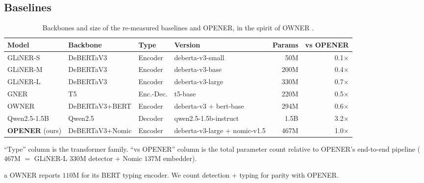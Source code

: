 \documentclass[pdflatex,sn-basic,Numbered]{sn-jnl}
\begin{document}
\subsection{Baselines}
\label{sec:exp:baselines}

\begin{table}[!t]
\centering
\caption{Backbones and size of the re-measured baselines and OPENER, in the spirit of OWNER \cite{genest2025owner}.}
\label{tab:baselines}
\footnotesize
\setlength{\tabcolsep}{4.5pt}
\begin{adjustbox}{max width=\textwidth}
\begin{threeparttable}
\begin{tabular}{@{}llllrr@{}}
\toprule
Model & Backbone & Type & Version & Params & vs OPENER \\
\midrule
GLiNER-S & DeBERTaV3 & Encoder & deberta-v3-small & 50M & 0.1$\times$ \\
GLiNER-M & DeBERTaV3 & Encoder & deberta-v3-base & 200M & 0.4$\times$ \\
GLiNER-L & DeBERTaV3 & Encoder & deberta-v3-large & 330M & 0.7$\times$ \\
GNER & T5 & Enc.-Dec. & t5-base & 220M & 0.5$\times$ \\
OWNER\tnote{a} & DeBERTaV3+BERT & Encoder & deberta-v3 + bert-base & 294M & 0.6$\times$ \\
Qwen2.5-1.5B & Qwen2.5 & Decoder & qwen2.5-1.5b-instruct & 1.5B & 3.2$\times$ \\
\midrule
\rowcolor{hlorange} \textbf{OPENER} (ours) & DeBERTaV3+Nomic & Encoder & deberta-v3-large + nomic-v1.5 & 467M & 1.0$\times$ \\
\bottomrule
\end{tabular}
\begin{tablenotes}[flushleft]
\footnotesize
\item ``Type'' column is the transformer family. ``vs OPENER'' column is the total parameter count relative to OPENER's end-to-end pipeline ($467$M $=$ GLiNER-L $330$M detector $+$ Nomic $137$M embedder).
\item[a] OWNER reports $110$M for its BERT typing encoder. We count detection $+$ typing for parity with OPENER.
\end{tablenotes}
\end{threeparttable}
\end{adjustbox}
\end{table}
\end{document}
